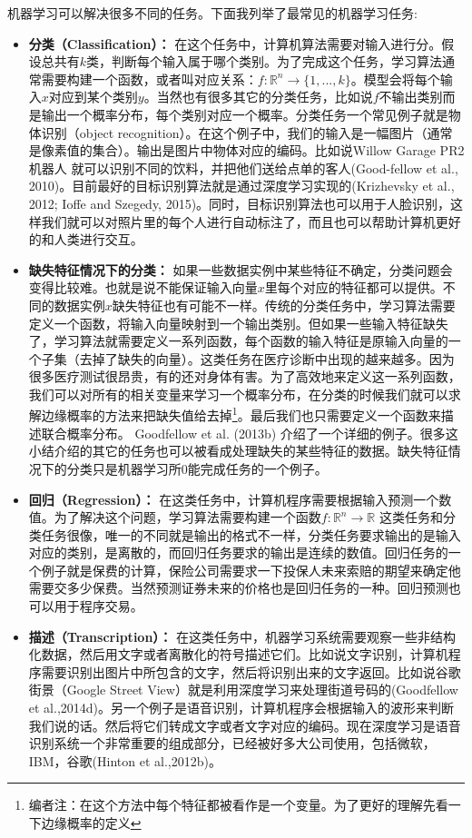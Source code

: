 机器学习可以解决很多不同的任务。下面我列举了最常见的机器学习任务:
\begin{itemize}
\item \textbf{分类（Classiﬁcation）：} 在这个任务中，计算机算法需要对输入进行分。假设总共有$k$类，判断每个输入属于哪个类别。为了完成这个任务，学习算法通常需要构建一个函数，或者叫对应关系：$f:\mathbb{R}^{n}\rightarrow \{1,...,k\}$。模型会将每个输入$x$对应到某个类别$y$。当然也有很多其它的分类任务，比如说$f$不输出类别而是输出一个概率分布，每个类别对应一个概率。分类任务一个常见例子就是物体识别（object recognition）。在这个例子中，我们的输入是一幅图片（通常是像素值的集合）。输出是图片中物体对应的编码。比如说Willow Garage PR2 机器人 就可以识别不同的饮料，并把他们送给点单的客人(Good-fellow et al., 2010)。目前最好的目标识别算法就是通过深度学习实现的(Krizhevsky et al., 2012; Ioﬀe and Szegedy, 2015)。同时，目标识别算法也可以用于人脸识别，这样我们就可以对照片里的每个人进行自动标注了，而且也可以帮助计算机更好的和人类进行交互。

\item \textbf{缺失特征情况下的分类：} 如果一些数据实例中某些特征不确定，分类问题会变得比较难。也就是说不能保证输入向量$x$里每个对应的特征都可以提供。不同的数据实例$x$缺失特征也有可能不一样。传统的分类任务中，学习算法需要定义一个函数，将输入向量映射到一个输出类别。但如果一些输入特征缺失了，学习算法就需要定义一系列函数，每个函数的输入特征是原输入向量的一个子集（去掉了缺失的向量）。这类任务在医疗诊断中出现的越来越多。因为很多医疗测试很昂贵，有的还对身体有害。为了高效地来定义这一系列函数，我们可以对所有的相关变量来学习一个概率分布，在分类的时候我们就可以求解边缘概率的方法来把缺失值给去掉\footnote{编者注：在这个方法中每个特征都被看作是一个变量。为了更好的理解先看一下边缘概率的定义}。最后我们也只需要定义一个函数来描述联合概率分布。 Goodfellow et al. (2013b) 介绍了一个详细的例子。很多这小结介绍的其它的任务也可以被看成处理缺失的某些特征的数据。缺失特征情况下的分类只是机器学习所0能完成任务的一个例子。

\item \textbf{回归（Regression）：}  在这类任务中，计算机程序需要根据输入预测一个数值。为了解决这个问题，学习算法需要构建一个函数$f:\mathbb{R}^{n}\rightarrow \mathbb{R}$ 这类任务和分类任务很像，唯一的不同就是输出的格式不一样，分类任务要求输出的是输入对应的类别，是离散的，而回归任务要求的输出是连续的数值。回归任务的一个例子就是保费的计算，保险公司需要求一下投保人未来索赔的期望来确定他需要交多少保费。当然预测证券未来的价格也是回归任务的一种。回归预测也可以用于程序交易。

\item \textbf{描述（Transcription）：}  在这类任务中，机器学习系统需要观察一些非结构化数据，然后用文字或者离散化的符号描述它们。比如说文字识别，计算机程序需要识别出图片中所包含的文字，然后将识别出来的文字返回。比如说谷歌街景（Google Street View）就是利用深度学习来处理街道号码的(Goodfellow et al.,2014d)。另一个例子是语音识别，计算机程序会根据输入的波形来判断我们说的话。然后将它们转成文字或者文字对应的编码。现在深度学习是语音识别系统一个非常重要的组成部分，已经被好多大公司使用，包括微软，IBM，谷歌(Hinton et al.,2012b)。


\end{itemize}
